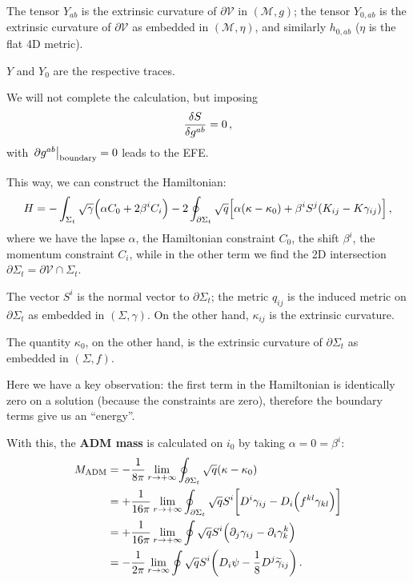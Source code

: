 \documentclass[main.tex]{subfiles}
\begin{document}
The tensor \(Y_{ab}\) is the extrinsic curvature of \(\partial \mathcal{V}\) in \((\mathcal{M}, g)\); the tensor \(Y_{0, ab}\) is the extrinsic curvature of \(\partial \mathcal{V}\) as embedded in \((\mathcal{M}, \eta )\), and similarly \(h_{0, ab}\) (\(\eta \) is the flat 4D metric). 
 
\(Y\) and \(Y_0 \) are the respective traces.

We will not complete the calculation, but imposing 
%
\begin{align}
\fdv{S}{g^{ab}} = 0 
\,,
\end{align}
%
with \(\eval{\partial g^{ab}}_{\text{boundary}} = 0\) leads to the EFE. 

This way, we can construct the Hamiltonian: 
%
\begin{align}
H = - \int_{\Sigma _t} \sqrt{\gamma } \qty(\alpha C_0 + 2 \beta^{i} C_i) - 2 \oint_{\partial \Sigma _t} \sqrt{q} \qty[\alpha (\kappa - \kappa_0) + \beta^{i} S^{j} (K_{ij} - K \gamma_{ij})]
\,,
\end{align}
%
where we have the lapse \(\alpha \), the Hamiltonian constraint \(C_0 \), the shift \(\beta^{i}\), the momentum constraint \(C_{i}\), while in the other term we find the 2D intersection \(\partial \Sigma _t = \partial \mathcal{V} \cap \Sigma _t\). 

The vector \(S^{i}\) is the normal vector to \(\partial \Sigma _t\); the metric \(q_{ij}\) is the induced metric on \(\partial \Sigma _t\) as embedded in \((\Sigma, \gamma )\). 
On the other hand, \(\kappa_{ij}\) is the extrinsic curvature. 

The quantity \(\kappa_0 \), on the other hand, is the extrinsic curvature of \(\partial \Sigma _t\) as embedded in \((\Sigma, f)\). 

Here we have a key observation: the first term in the Hamiltonian is identically zero on a solution (because the constraints are zero), therefore the boundary terms give us an ``energy''. 

With this, the \textbf{ADM mass} is calculated on \(i_0 \) by taking \(\alpha = 0 = \beta^{i}\): 
%
\begin{align}
M _{\text{ADM}} &= - \frac{1}{8 \pi } \lim_{r \to + \infty } \oint_{\partial \Sigma _t} \sqrt{q} \qty(\kappa - \kappa_0 )  \\
&= + \frac{1}{16 \pi } \lim_{r \to + \infty } 
\oint_{\partial \Sigma _t} \sqrt{q} S^{i} \qty[D^{i} \gamma_{ij} - D_i \qty(f^{kl} \gamma_{kl})]  \\
&= + \frac{1}{16 \pi } \lim_{r \to + \infty } 
\oint \sqrt{q} S^{i} \qty(\partial_{j} \gamma_{ij} - \partial_{i} \gamma^{k}_{k})  \\
&= - \frac{1}{2 \pi  } \lim_{r \to \infty }
\oint \sqrt{q} S^{i} \qty(D_i \psi - \frac{1}{8} D^{j} \widetilde{\gamma}_{ij})
\,.
\end{align}
\end{document}
